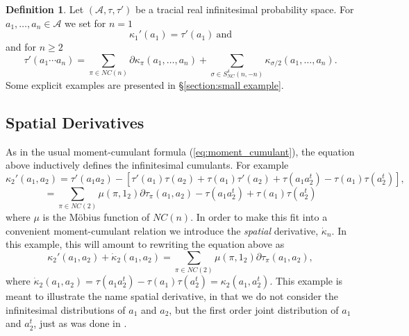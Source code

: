 \documentclass[11pt]{amsart}
\theoremstyle{definition}
\newtheorem{definition}[theorem]{Definition}
\numberwithin{theorem}{section}
\newcommand{\cA}{\mathcal{A}}
\newcommand{\NC}{\mathit{NC}}
\begin{document}
\begin{definition}\label{definition:real infinitesimal cumulants}
Let $(\cA, \tau, \tau')$ be a tracial real infinitesimal
probability space. For $a_1, \dots, a_n \in \cA$ we set for
$n = 1$
\[
\kappa_1'(a_1) = \tau'(a_1)\ \mbox{and}
\]
and for $n \geq 2$
\begin{equation}\label{eq:real infinitesimal moment cumulant}
\tau'(a_1 \cdots a_n) =
\sum_{\pi \in \NC(n)} \partial \kappa_\pi(a_1, \dots, a_n)
+
\sum_{\sigma \in S_\NC^\delta (n, -n)} \kappa_{\sigma/2}(a_1, \dots, a_n).
\end{equation}
Some explicit examples are presented in \S \ref{section:small example}. 
\end{definition}

\subsection{Spatial Derivatives}
As in the usual moment-cumulant formula
(\ref{eq:moment_cumulant}), the equation above inductively
defines the infinitesimal cumulants. For example
\[
\kappa_2'(a_1, a_2) = \tau'(a_1 a_2) -[ \tau'(a_1) \tau(a_2)  + \tau(a_1) \tau'(a_2)  + \tau(a_1a_2^t) - \tau(a_1) \tau(a_2^t)],
\]
\[
= \sum_{\pi \in \NC(2)} \mu(\pi, 1_2) \partial \tau_\pi(a_1, a_2) - \tau(a_1a_2^t) + \tau(a_1) \tau(a_2^t)
\]
where $\mu$ is the M\"obius function of $\NC(n)$. In order
to make this fit into a convenient moment-cumulant relation
we introduce the \textit{spatial} derivative,
$\dot\kappa_n$. In this example, this will amount to
rewriting the equation above as
\[
%
\kappa_2'(a_1, a_2)  + \dot{\kappa}_2(a_1, a_2) =
\sum_{\pi \in \NC(2)} \mu(\pi, 1_2) \partial \tau_\pi(a_1, a_2),
\]
where $\dot{\kappa}_2(a_1, a_2) = \tau(a_1a_2^t) - \tau(a_1)
\tau(a_2^t) = \kappa_2(a_1, a_2^t)$. This example is meant
to illustrate the name spatial derivative, in that we do not
consider the infinitesimal distributions of $a_1$ and $a_2$,
but the first order joint distribution of $a_1$ and $a_2^t$,
just as was done in \cite[Def.~2.10]{cmss}.
\end{document}
